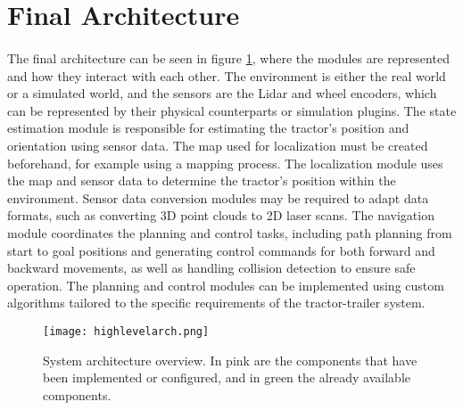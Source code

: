 \section{Final Architecture}
\label{sec:final_architecture}

\paragraph{}The final architecture can be seen in figure \ref{fig:system_architecture}, 
where the modules are represented and how they interact with each other. The environment is either 
the real world or a simulated world, and the sensors are the Lidar and wheel encoders, 
which can be represented by their physical counterparts or simulation plugins. The state estimation module 
is responsible for estimating the tractor's position and orientation using sensor data. 
The map used for localization must be created beforehand, for example using a mapping process. The localization module 
uses the map and sensor data to determine the tractor's position within the environment. Sensor data conversion modules 
may be required to adapt data formats, such as converting 3D point clouds to 2D laser scans. The navigation module 
coordinates the planning and control tasks, including path planning from start to goal positions and generating control commands 
for both forward and backward movements, as well as handling collision detection to ensure safe operation. The planning and control modules 
can be implemented using custom algorithms tailored to the specific requirements of the tractor-trailer system.



\begin{figure}[h]
    \centering
    \texttt{[image: highlevelarch.png]}
    \caption{System architecture overview. In pink are the components that have been implemented or configured, and in green the already available components.}
    \label{fig:system_architecture}
\end{figure}
